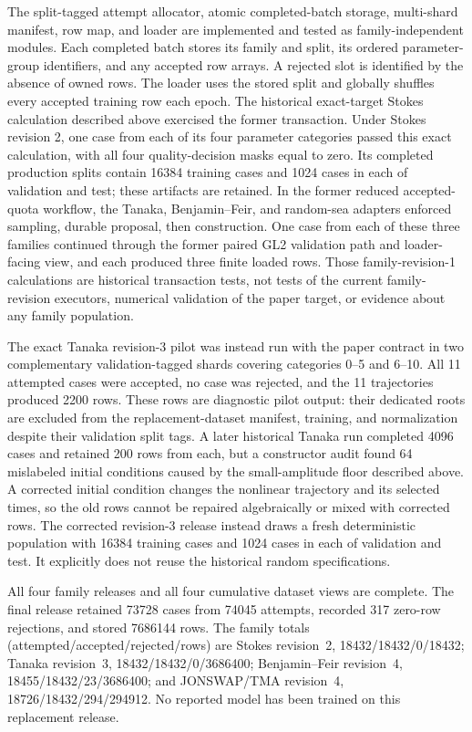 The split-tagged attempt allocator, atomic completed-batch storage, multi-shard
manifest, row map, and loader are implemented and tested as family-independent
modules.  Each completed batch stores its family and split, its ordered
parameter-group identifiers, and any accepted row arrays.  A rejected slot is
identified by the absence of owned rows.  The loader uses the stored split and
globally shuffles every accepted training row each epoch.  The historical
exact-target Stokes calculation described above exercised the former
transaction.  Under
Stokes revision 2, one case from each of its four parameter categories passed
this exact calculation, with all four quality-decision masks equal to zero.
Its completed production splits contain 16384 training cases and 1024 cases
in each of validation and test; these artifacts are retained.
In the former reduced accepted-quota workflow, the Tanaka, Benjamin--Feir, and
random-sea adapters enforced sampling, durable proposal, then construction.
One case from each of these three families continued through the former paired
GL2 validation path and loader-facing view, and each produced three finite
loaded rows.  Those
family-revision-1 calculations are historical transaction tests, not tests of
the current family-revision executors, numerical validation of the paper
target, or evidence about any family population.

The exact Tanaka revision-3 pilot was instead run with the paper contract in
two complementary validation-tagged shards covering categories 0--5 and
6--10.  All 11 attempted cases were accepted, no case was rejected, and the
11 trajectories produced 2200 rows.  These rows are diagnostic pilot output:
their dedicated roots are excluded from the replacement-dataset manifest,
training, and normalization despite their validation split tags.  A later
historical Tanaka run completed 4096 cases and retained 200 rows from each,
but a constructor audit found 64 mislabeled initial conditions caused by the
small-amplitude floor described above.  A corrected initial condition changes
the nonlinear trajectory and its selected times, so the old rows cannot be
repaired algebraically or mixed with corrected rows.  The corrected
revision-3 release instead draws a fresh deterministic population with 16384
training cases and 1024 cases in each of validation and test.  It explicitly
does not reuse the historical random specifications.

All four family releases and all four cumulative dataset views are complete.
The final release retained \num{73728} cases from \num{74045} attempts,
recorded \num{317} zero-row rejections, and stored \num{7686144} rows.  The
family totals (attempted/accepted/rejected/rows) are Stokes revision~2,
\num{18432}/\num{18432}/0/\num{18432}; Tanaka revision~3,
\num{18432}/\num{18432}/0/\num{3686400}; Benjamin--Feir revision~4,
\num{18455}/\num{18432}/23/\num{3686400}; and JONSWAP/TMA revision~4,
\num{18726}/\num{18432}/294/\num{294912}.  No reported model has been trained
on this replacement release.

